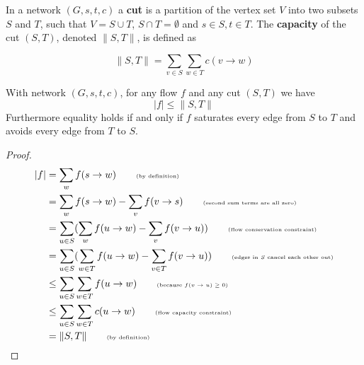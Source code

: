 \begin{defn}\label{networkcut}
In a network $(G, s, t, c)$ a \textbf{cut} is a partition of the vertex set $V$ into two subsets $S$ and $T$, such that $V = S \cup T$, $S \cap T = \emptyset$ and $s \in S, t \in T$. The \textbf{capacity} of the cut $(S, T)$, denoted $\|S,T\|$, is defined as

$$
\|S, T\| = \sum_{v \in S} \sum_{w \in T} c(v \rightarrow w)
$$
\end{defn}

\begin{thm}\label{flowcut}
With network $(G, s, t, c)$, for any flow $f$ and any cut $(S, T)$ we have
$$
  |f| \leq \|S, T\|
$$
Furthermore equality holds if and only if $f$ saturates every edge from $S$ to $T$ and avoids every edge from $T$ to $S$.
\end{thm}

\begin{proof}

\begin{align*}
|f| &= \sum_w f(s \rightarrow w) \tag*{\tiny{(by definition)}}\\
    &= \sum_w f(s \rightarrow w) - \sum_v f(v \rightarrow s) \tag*{\tiny{(second sum terms are all zero)}}\\
    &= \sum_{u \in S} (\sum_w f(u \rightarrow w) - \sum_v f(v \rightarrow u)) \tag*{\tiny{(flow conservation constraint)}}\\
    &= \sum_{u \in S} (\sum_{w \in T} f(u \rightarrow w) - \sum_{v \in T} f(v \rightarrow u)) \tag*{\tiny{(edges in $S$ cancel each other out)}}\\
    &\leq \sum_{u \in S} \sum_{w \in T} f(u \rightarrow w) \tag*{\tiny{(because $f(v \rightarrow u) \geq 0$)}}\\
    &\leq \sum_{u \in S} \sum_{w \in T} c(u \rightarrow w) \tag*{\tiny{(flow capacity constraint)}}\\
    &= \|S, T\| \tag*{\tiny{(by definition)}}
\end{align*}

\end{proof}


